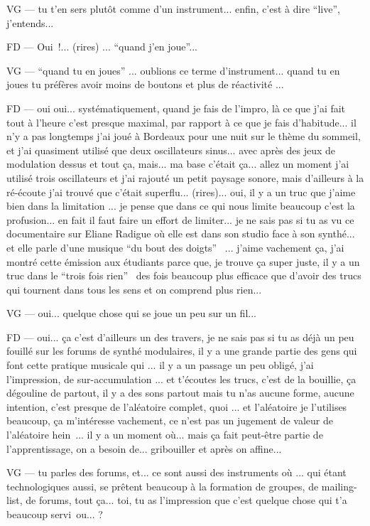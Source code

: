 VG — tu t'en sers plutôt comme d'un instrument... enfin, c'est à dire ``live'', j'entends...  

FD — Oui !... (rires) ... ``quand j'en joue''... 

VG — ``quand tu en joues'' ... oublions ce terme d'instrument... quand tu en joues tu préfères avoir moins de boutons et plus de réactivité ... 

FD — oui oui... systématiquement, quand je fais de l'impro, là ce que j'ai fait tout à l'heure c'est presque maximal, par rapport à ce que je fais d'habitude... il n'y a pas longtemps j'ai joué à Bordeaux pour une nuit sur le thème du sommeil, et j'ai quasiment utilisé que deux oscillateurs sinus... avec après des jeux de modulation dessus et tout ça, mais... ma base c'était ça... allez un moment j'ai utilisé trois oscillateurs et j'ai rajouté un petit paysage sonore, mais d'ailleurs à la ré-écoute j'ai trouvé que c'était superflu... (rires)... oui, il y a un truc que j'aime bien dans la limitation ... je pense que dans ce qui nous limite beaucoup c'est la profusion... en fait il faut faire un effort de limiter... je ne sais pas si tu as vu ce documentaire sur Eliane Radigue où elle est dans son studio face à son synthé... et elle parle d'une musique ``du bout des doigts''  ... j'aime vachement ça, j'ai montré cette émission aux étudiants parce que,  je trouve ça super juste, il y a un truc dans le ``trois fois rien''  des fois beaucoup plus efficace que d'avoir des trucs qui tournent dans tous les sens et on comprend plus rien... 

VG — oui... quelque chose qui se joue un peu sur un fil... 

FD — oui... ça c'est d'ailleurs un des travers, je ne sais pas si tu as déjà un peu fouillé sur les forums de synthé modulaires, il y a une grande partie des gens qui font cette pratique musicale qui ... il y a un passage un peu obligé, j'ai l'impression, de sur-accumulation ... et t'écoutes les trucs, c'est de la bouillie, ça dégouline de partout, il y a des sons partout mais tu n'as aucune forme, aucune intention, c'est presque de l'aléatoire complet, quoi ... et l'aléatoire je l'utilises beaucoup, ça m'intéresse vachement, ce n'est pas un jugement de valeur de l'aléatoire hein ... il y a un moment où... mais ça fait peut-être partie de l'apprentissage, on a besoin de... gribouiller et après on affine... 

VG — tu parles des forums, et... ce sont aussi des instruments où ... qui étant technologiques aussi, se prêtent beaucoup à la formation de groupes, de mailing-list, de forums, tout ça... toi, tu as l'impression que c'est quelque chose qui t'a beaucoup servi ou... ? 

